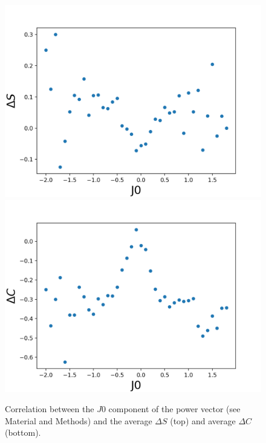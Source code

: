 \documentclass[article,twocolumn,preprint,10pt]{paper}%
\renewcommand{\(}{\left(}
\renewcommand{\)}{\right)}
\renewcommand{\[}{\left[}
\renewcommand{\]}{\right]}
\newcommand{\1}{\mbox{\boldmath$1$}}
\begin{document}
   \begin{figure}[h!]
   	\includegraphics[width=1\linewidth]{dSvsJ0}
   	\includegraphics[width=1\linewidth]{dCvsJ0}
   	\label{fig:dSdCvsJ0}
   	\caption{Correlation between the $J0$ component of the power vector (see Material and Methods) and the average $\Delta S$ (top) and average $\Delta C$ (bottom).}
   \end{figure}
\end{document}

